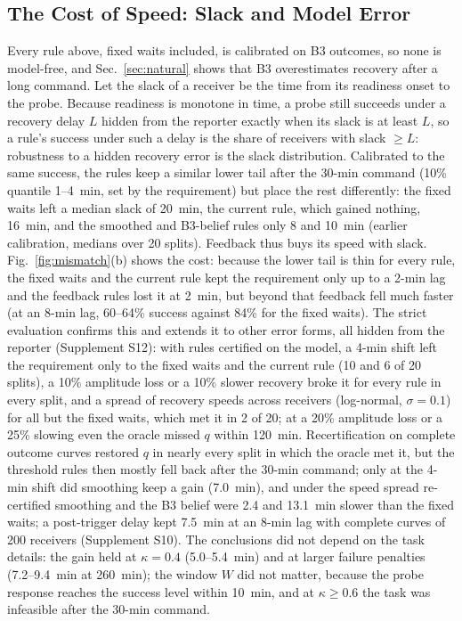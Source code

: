 \documentclass[conference]{IEEEtran}
\begin{document}
\subsection{The Cost of Speed: Slack and Model Error}
\label{sec:mismatch}
Every rule above, fixed waits included, is calibrated on B3 outcomes, so none is model-free, and Sec.~\ref{sec:natural} shows that B3 overestimates recovery after a long command. Let the slack of a receiver be the time from its readiness onset to the probe. Because readiness is monotone in time, a probe still succeeds under a recovery delay $L$ hidden from the reporter exactly when its slack is at least $L$, so a rule's success under such a delay is the share of receivers with slack $\geq L$: robustness to a hidden recovery error is the slack distribution. Calibrated to the same success, the rules keep a similar lower tail after the 30-min command (10\% quantile 1--4~min, set by the requirement) but place the rest differently: the fixed waits left a median slack of 20~min, the current rule, which gained nothing, 16~min, and the smoothed and B3-belief rules only 8 and 10~min (earlier calibration, medians over 20 splits). Feedback thus buys its speed with slack. Fig.~\ref{fig:mismatch}(b) shows the cost: because the lower tail is thin for every rule, the fixed waits and the current rule kept the requirement only up to a 2-min lag and the feedback rules lost it at 2~min, but beyond that feedback fell much faster (at an 8-min lag, 60--64\% success against 84\% for the fixed waits). The strict evaluation confirms this and extends it to other error forms, all hidden from the reporter (Supplement S12): with rules certified on the model, a 4-min shift left the requirement only to the fixed waits and the current rule (10 and 6 of 20 splits), a 10\% amplitude loss or a 10\% slower recovery broke it for every rule in every split, and a spread of recovery speeds across receivers (log-normal, $\sigma=0.1$) for all but the fixed waits, which met it in 2 of 20; at a 20\% amplitude loss or a 25\% slowing even the oracle missed $q$ within 120~min. Recertification on complete outcome curves restored $q$ in nearly every split in which the oracle met it, but the threshold rules then mostly fell back after the 30-min command; only at the 4-min shift did smoothing keep a gain (7.0~min), and under the speed spread re-certified smoothing and the B3 belief were 2.4 and 13.1~min slower than the fixed waits; a post-trigger delay kept 7.5~min at an 8-min lag with complete curves of 200 receivers (Supplement S10). The conclusions did not depend on the task details: the gain held at $\kappa=0.4$ (5.0--5.4~min) and at larger failure penalties (7.2--9.4~min at 260~min); the window $W$ did not matter, because the probe response reaches the success level within 10~min, and at $\kappa\geq0.6$ the task was infeasible after the 30-min command.
\end{document}
